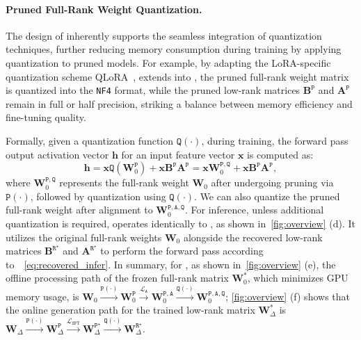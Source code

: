 \paragraph{Pruned Full-Rank Weight Quantization.}
The design of \method inherently supports the seamless integration of quantization techniques, further reducing memory consumption during training by applying quantization to pruned models. For example, by adapting the LoRA-specific quantization scheme QLoRA~\citep{Tim:2023qlora}, \method extends into \Qmethod,
the pruned full-rank weight matrix is quantized into the \texttt{NF4} format, while the pruned low-rank matrices $\mathbf{B}^\mathtt{P}$ and $\mathbf{A}^\mathtt{P}$ remain in full or half precision, striking a balance between memory efficiency and fine-tuning quality.

Formally, given a quantization function $\mathtt{Q}(\cdot)$, during training, the forward pass output activation vector $\mathbf{h}$ for an input feature vector $\mathbf{x}$ is computed as: 
\begin{equation}
\mathbf{h}
=\mathbf{x} \mathtt{Q}(\mathbf{W}_{0}^\mathtt{P}) + \mathbf{x} \mathbf{B}^\mathtt{P} \mathbf{A}^\mathtt{P}
=\mathbf{x} \mathbf{W}_{0}^\mathtt{P,Q} + \mathbf{x} \mathbf{B}^\mathtt{P} \mathbf{A}^\mathtt{P},
\end{equation}
where $\mathbf{W}_{0}^\mathtt{P,Q}$ represents the full-rank weight $\mathbf{W}_{0}$ after undergoing pruning via $\mathtt{P}(\cdot)$, followed by quantization using $\mathtt{Q}(\cdot)$. 
We can also quantize the pruned full-rank weight after alignment to $\mathbf{W}_{0}^\mathtt{P,A,Q}$. 
For inference, unless additional quantization is required, \Qmethod operates identically to \method, as shown in~\cref{fig:overview} (d). 
It utilizes the original full-rank weights $\mathbf{W}_{0}$ alongside the recovered low-rank matrices $\mathbf{B}^{\mathtt{R}^{\star}}$ and $\mathbf{A}^{\mathtt{R}^{\star}}$ to perform the forward pass according to~~\cref{eq:recovered_infer}.
In summary, for \method, as shown in~\cref{fig:overview} (e), the offline processing path of the frozen full-rank matrix $\mathbf{W}_{0}^{*}$, which minimizes 
{GPU}
memory usage, is $\mathbf{W}_{0} 
\stackrel{\mathtt{P}(\cdot)}{\longrightarrow} 
\mathbf{W}_{0}^{\mathtt{P}} \stackrel{\mathcal{L}_{\mathtt{A}}}{\longrightarrow}
\mathbf{W}_{0}^{\mathtt{P,A}}
\stackrel{\mathtt{Q}(\cdot)}{\longrightarrow}
\mathbf{W}_{0}^{\mathtt{P,A,Q}}
$;
\cref{fig:overview} (f) shows that
the online generation path for the trained low-rank matrix $\mathbf{W}_{\Delta}^{*}$ is
$\mathbf{W}_{\Delta} 
\stackrel{\mathtt{P}(\cdot)}{\longrightarrow} 
\mathbf{W}_{\Delta}^{\mathtt{P}} \stackrel{\mathcal{L}_{\mathtt{SFT}}}{\longrightarrow}
\mathbf{W}_{\Delta}^{\mathtt{P}^{\star}}
\stackrel{\mathtt{Q}(\cdot)}{\longrightarrow}
\mathbf{W}_{\Delta}^{\mathtt{R}^{\star}}
$.
